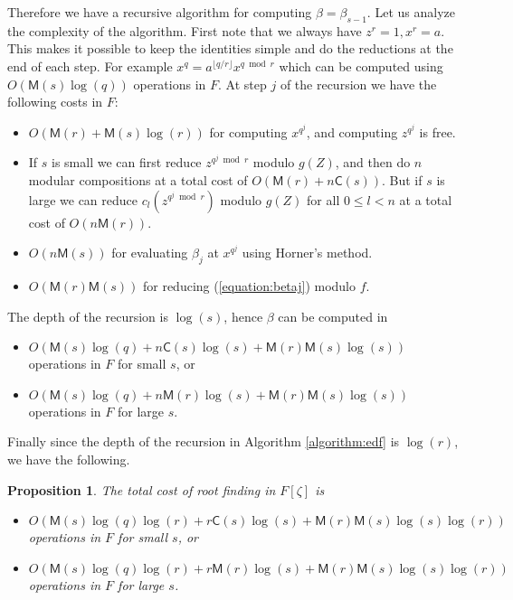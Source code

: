 \documentclass[12pt]{article}
\theoremstyle{plain}
\newtheorem{proposition}[theorem]{Proposition}
\theoremstyle{definition}
\def\MM{\ensuremath{\mathsf{M}}}
\def\CC{\ensuremath{\mathsf{C}}}
\newcounter{algorithm}
\begin{document}
Therefore we have a recursive algorithm for computing $\beta = \beta_{s - 1}$. Let us analyze the 
complexity of the algorithm. First note that we always have $z^r = 1, x^r = a$. This makes it 
possible to keep the identities simple and do the reductions at the end of each step. For example 
$x^q = a^{\lfloor q / r\rfloor}x^{q \bmod r}$ which can be computed using $O(\MM(s)\log(q))$
operations in $F$. At step $j$ of the recursion we have the following costs in $F$:
\begin{itemize}
	\item $O(\MM(r) + \MM(s)\log(r))$ for computing $x^{q^j}$, and computing $z^{q^j}$ is free.
	\item If $s$ is small we can first reduce $z^{q^j \bmod r}$ modulo $g(Z)$, and then do $n$ 
	modular compositions at a total cost
	of $O(\MM(r) + n\CC(s))$. But if $s$ is large we can reduce $c_l(z^{q^j \bmod r})$ modulo 
	$g(Z)$ for all $0 \le l < n$ at a total cost of $O(n\MM(r))$.
	\item $O(n\MM(s))$ for evaluating $\beta_j$ at $x^{q^j}$ using Horner's method.
	\item $O(\MM(r)\MM(s))$ for reducing (\ref{equation:betaj}) modulo $f$.
\end{itemize}
The depth of the recursion is $\log(s)$, hence $\beta$ can be computed in
\begin{itemize}
	\item $O(\MM(s)\log(q) + n\CC(s)\log(s) + \MM(r)\MM(s)\log(s))$ operations in $F$ for small 
	$s$, or
	\item $O(\MM(s)\log(q) + n\MM(r)\log(s) + \MM(r)\MM(s)\log(s))$ operations in $F$ for large 
	$s$.
\end{itemize} 
Finally since the depth of the recursion in Algorithm \ref{algorithm:edf} is $\log(r)$, we have the 
following.
\begin{proposition}
	\label{proposition:root-fpz}
	The total cost of root finding in $F[\zeta]$ is
	\begin{itemize}
		\item $O(\MM(s)\log(q)\log(r) + r\CC(s)\log(s) + \MM(r)\MM(s)\log(s)\log(r))$\\ operations 
		in $F$ for small $s$, or
		\item $O(\MM(s)\log(q)\log(r) + r\MM(r)\log(s) + \MM(r)\MM(s)\log(s)\log(r))$\\ operations 
		in $F$ for large $s$.
	\end{itemize}
\end{proposition}
\end{document}

